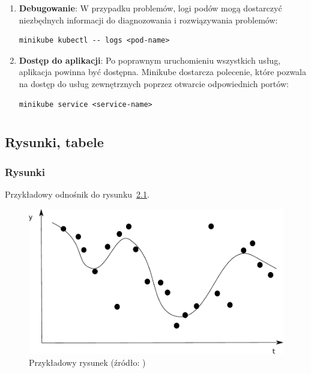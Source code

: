 \documentclass[polish]{aghengthesis}
\begin{document}
\begin{enumerate}
    \item \textbf{Debugowanie}:
    W przypadku problemów, logi podów mogą dostarczyć niezbędnych informacji do diagnozowania i rozwiązywania problemów:
\begin{lstlisting}[basicstyle=\ttfamily, numbers=none]
minikube kubectl -- logs <pod-name>\end{lstlisting}

    \item \textbf{Dostęp do aplikacji}:
    Po poprawnym uruchomieniu wszystkich usług, aplikacja powinna być dostępna. Minikube dostarcza polecenie, które pozwala na dostęp do usług zewnętrznych poprzez otwarcie odpowiednich portów:
\begin{lstlisting}[basicstyle=\ttfamily, numbers=none]
minikube service <service-name>\end{lstlisting}
\end{enumerate}

\chapter{\ChapterTitleDemoDeployment}
\label{sec:deployment}

\chapter{\ChapterTitleSummary}
\label{sec:podsumowanie}



\section{Rysunki, tabele}
\label{sec:rysunki-tabele}

\subsection{Rysunki}
\label{sec:rysunki}

Przykładowy odnośnik do rysunku~\ref{fig:ex1}.

\begin{figure}[!htbp]
  \centering
\includegraphics[width=.7\textwidth]{resources/example.pdf}
\caption[Przykładowy rysunek]{Przykładowy rysunek (źródło:
  \cite{author2021title})}
\label{fig:ex1}
\end{figure}
 
\end{document}
